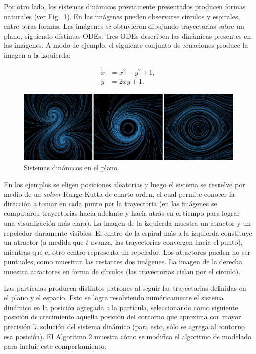 Por otro lado, los sistemas din\'amicos previamente presentados producen formas naturales (ver Fig.~\ref{fg:sistdin2}).
En las im\'agenes pueden observarse c\'irculos y espirales, entre otras formas.
Las im\'agenes se obtuvieron dibujando trayectorias sobre un plano, siguiendo distintas ODEs.
Tres ODEs describen las din\'amicas presentes en las im\'agenes.
A modo de ejemplo, el siguiente conjunto de ecuaciones produce la imagen a la izquierda:

\begin{equation} \label{eq:simple}  
  \begin{aligned}
    \dot{x} &= x^{2}-y^{2}+1,\\
    \dot{y} &= 2xy+1.
  \end{aligned}
\end{equation}


\begin{figure}[htb!]
  \centerline{\includegraphics[width=13cm]{figures/sistdin2}}
  \caption{Sistemas dinámicos en el plano.}
  \label{fg:sistdin2}
\end{figure}

En los ejemplos se eligen posiciones aleatorias y luego el sistema se resuelve por medio de un {\em solver} Runge-Kutta de cuarto orden, el cual permite conocer la direcci\'on a tomar en cada punto por la trayectoria (en las im\'agenes se computaron trayectorias hacia adelante y hacia atrás en el tiempo para lograr una visualizaci\'on más clara).
La imagen de la izquierda muestra un atractor y un repeledor claramente visibles.
El centro de la espiral m\'as a la izquierda constituye un atractor (a medida que $t$ avanza, las trayectorias convergen hacia el punto), mientras que el otro centro representa un repeledor.
Los atractores pueden no ser puntuales, como muestran las restantes dos im\'agenes.
La imagen de la derecha muestra atractores en forma de c\'irculos (las trayectorias ciclan por el c\'irculo).

Las part\'iculas producen distintos patrones al seguir las trayectorias definidas en el plano y el espacio.
Esto se logra resolviendo num\'ericamente el sistema din\'amico en la posici\'on agregada a la part\'icula, seleccionando como siguiente posici\'on de crecimiento aquella posici\'on del contorno que aproxima con mayor precisión la soluci\'on del sistema din\'amico (para esto, sólo se agrega al contorno esa posición).
El Algoritmo $2$ muestra cómo se modifica el algoritmo de modelado para incluir este comportamiento.

